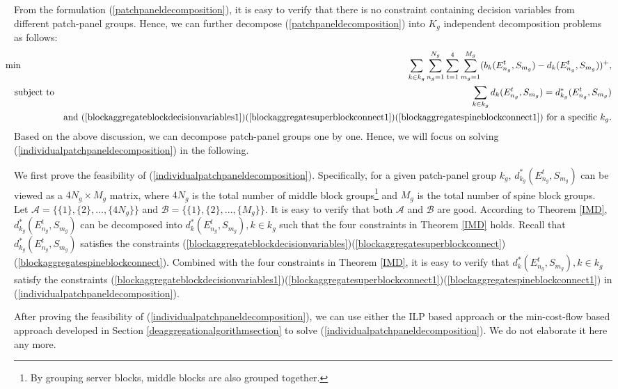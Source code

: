 \documentclass[letterpaper,twocolumn,10pt]{article}
\begin{document}
From the formulation (\ref{patchpaneldecomposition}), it is easy to verify that there is no constraint containing decision variables from different patch-panel groups. Hence, we can further decompose (\ref{patchpaneldecomposition}) into $K_g$ independent decomposition problems as follows:
\begin{eqnarray}\label{individualpatchpaneldecomposition}
&\hspace{-4mm}\min&\hspace{-9mm}\sum_{k\in k_g}\sum_{n_g=1}^{N_g}\sum_{t=1}^4\sum_{m_g=1}^{M_g}(b_k(E_{n_g}^t,S_{m_g})-d_k(E_{n_g}^t,S_{m_g}))^+,\nonumber\\
&\text{subject to}& \sum_{k\in k_g}d_k(E_{n_g}^t,S_{m_g})=d^*_{k_g}(E_{n_g}^t, S_{m_g})\\
&&\text{and }(\ref{blockaggregateblockdecisionvariables1})(\ref{blockaggregatesuperblockconnect1})(\ref{blockaggregatespineblockconnect1})\text{ for a specific }k_g.\nonumber
\end{eqnarray}
Based on the above discussion, we can decompose patch-panel groups one by one. Hence, we will focus on solving (\ref{individualpatchpaneldecomposition}) in the following.

We first prove the feasibility of (\ref{individualpatchpaneldecomposition}). Specifically, for a given patch-panel group $k_g$, $d^*_{k_g}(E_{n_g}^t, S_{m_g})$ can be viewed as a $4N_g\times M_g$ matrix, where $4N_g$ is the total number of middle block groups\footnote{By grouping server blocks, middle blocks are also grouped together.} and $M_g$ is the total number of spine block groups. Let $\mathcal{A} =\{\{1\}, \{2\},..., \{4N_g\}\}$ and $\mathcal{B} =\{\{1\}, \{2\},..., \{M_g\}\}$. It is easy to verify that both $\mathcal{A}$ and $\mathcal{B}$ are good. According to Theorem \ref{IMD}, $d^*_{k_g}(E_{n_g}^t, S_{m_g})$ can be decomposed into $d^*_{k}(E_{n_g}^t, S_{m_g}), k\in k_g$ such that the four constraints in Theorem \ref{IMD} holds. Recall that $d^*_{k_g}(E_{n_g}^t, S_{m_g})$ satisfies the constraints (\ref{blockaggregateblockdecisionvariables})(\ref{blockaggregatesuperblockconnect})(\ref{blockaggregatespineblockconnect}). Combined with the four constraints in Theorem \ref{IMD}, it is easy to verify that $d^*_{k}(E_{n_g}^t, S_{m_g}), k\in k_g$ satisfy the constraints (\ref{blockaggregateblockdecisionvariables1})(\ref{blockaggregatesuperblockconnect1})(\ref{blockaggregatespineblockconnect1}) in (\ref{individualpatchpaneldecomposition}).

After proving the feasibility of (\ref{individualpatchpaneldecomposition}), we can use either the ILP based approach or the min-cost-flow based approach developed in Section \ref{deaggregationalgorithmsection} to solve (\ref{individualpatchpaneldecomposition}). We do not elaborate it here any more.
\end{document}
